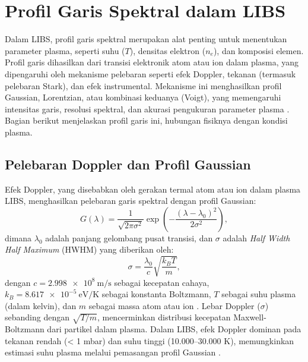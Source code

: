 \section{Profil Garis Spektral dalam LIBS}

Dalam LIBS, profil garis spektral merupakan alat penting untuk menentukan parameter plasma, seperti suhu (\( T \)), densitas elektron (\( n_e \)), dan komposisi elemen. Profil garis dihasilkan dari transisi elektronik atom atau ion dalam plasma, yang dipengaruhi oleh mekanisme pelebaran seperti efek Doppler, tekanan (termasuk pelebaran Stark), dan efek instrumental. Mekanisme ini menghasilkan profil Gaussian, Lorentzian, atau kombinasi keduanya (Voigt), yang memengaruhi intensitas garis, resolusi spektral, dan akurasi pengukuran parameter plasma \citep{Demtroder2010,Griem1997}. Bagian berikut menjelaskan profil garis ini, hubungan fisiknya dengan kondisi plasma.

\subsection{Pelebaran Doppler dan Profil Gaussian}
Efek Doppler, yang disebabkan oleh gerakan termal atom atau ion dalam plasma LIBS, menghasilkan pelebaran garis spektral dengan profil Gaussian:
\begin{equation}
G(\lambda) = \frac{1}{\sqrt{2\pi \sigma^2}} \exp\left(-\frac{(\lambda - \lambda_0)^2}{2\sigma^2}\right), \label{eq:bab2_eq29}
\end{equation}
dimana \( \lambda_0 \) adalah panjang gelombang pusat transisi, dan \( \sigma \) adalah \textit{Half Width Half Maximum} (HWHM) yang diberikan oleh:
\begin{equation}
\sigma = \frac{\lambda_0}{c} \sqrt{\frac{k_B T}{m}}, \label{eq:bab2_eq30}
\end{equation}
dengan \( c = \SI{2.998e8}{\meter\per\second} \) sebagai kecepatan cahaya, \( k_B = \SI{8.617e-5}{\electronvolt\per\kelvin} \) sebagai konstanta Boltzmann, \( T \) sebagai suhu plasma (dalam kelvin), dan \( m \) sebagai massa atom atau ion \citep{Demtroder2010}. Lebar Doppler (\( \sigma \)) sebanding dengan \( \sqrt{T/m} \), mencerminkan distribusi kecepatan Maxwell-Boltzmann dari partikel dalam plasma. Dalam LIBS, efek Doppler dominan pada tekanan rendah (< 1 mbar) dan suhu tinggi (10.000–30.000 K), memungkinkan estimasi suhu plasma melalui pemasangan profil Gaussian \citep{Miziolek2006}.

